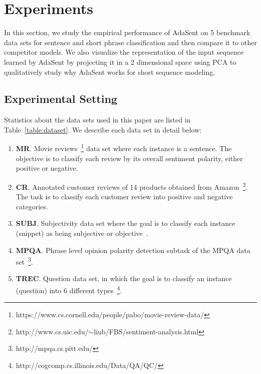 \documentclass{article}
\theoremstyle{definition}
\begin{document}
\section{Experiments}
In this section, we study the empirical performance of AdaSent on 5 benchmark data sets for sentence and short phrase classification and then compare it to other competitor models. We also visualize the representation of the input sequence learned by AdaSent by projecting it in a 2 dimensional space using PCA to qualitatively study why AdaSent works for short sequence modeling. 
\label{sec:experiment}
\subsection{Experimental Setting}
Statistics about the data sets used in this paper are listed in Table~\ref{table:dataset}. We describe each data set in detail below:
\begin{enumerate}
	\item 	\textbf{MR}. Movie reviews~\cite{pang2005seeing}\footnote{https://www.cs.cornell.edu/people/pabo/movie-review-data/} data set where each instance is a sentence. The objective is to classify each review by its overall sentiment polarity, either positive or negative.
	\item 	\textbf{CR}. Annotated customer reviews of 14 products obtained from Amazon~\cite{hu2004mining}\footnote{http://www.cs.uic.edu/$\sim$liub/FBS/sentiment-analysis.html}. The task is to classify each customer review into positive and negative categories.
	\item 	\textbf{SUBJ}. Subjectivity data set where the goal is to classify each instance (snippet) as being subjective or objective~\cite{pang2004sentimental}.
	\item 	\textbf{MPQA}. Phrase level opinion polarity detection subtask of the MPQA data set~\cite{wiebe2005annotating}\footnote{http://mpqa.cs.pitt.edu/}.
	\item 	\textbf{TREC}. Question data set, in which the goal is to classify an instance (question) into 6 different types~\cite{li2002learning}\footnote{http://cogcomp.cs.illinois.edu/Data/QA/QC/}.
\end{enumerate}
\end{document}
